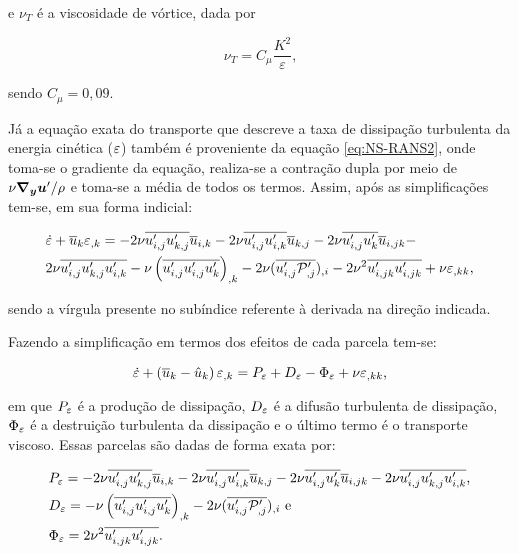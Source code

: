 \noindent e $\nu_T$ é a viscosidade de vórtice, dada por

\begin{equation}
    \nu_T=C_\mu\frac{K^2}{\varepsilon}\text{,}
\end{equation}

\noindent sendo $C_\mu=0,09$.

Já a equação exata do transporte que descreve a taxa de dissipação turbulenta da energia cinética ($\varepsilon$) também é proveniente da equação \eqref{eq:NS-RANS2}, onde toma-se o gradiente da equação, realiza-se a contração dupla por meio de $\nu\boldsymbol{\nabla_y}\boldsymbol{u}'/\rho$ e toma-se a média de todos os termos. Assim, após as simplificações tem-se, em sua forma indicial:

\begin{equation}
    \begin{split}
        &\dot{\varepsilon}+\overline{u}_k\varepsilon_{,k}=-2\nu\overline{u'_{i,j}u'_{k,j}}\overline{u}_{i,k}-2\nu\overline{u'_{i,j}u'_{i,k}}\overline{u}_{k,j}-2\nu\overline{u'_{i,j}u'_k}\overline{u}_{i,jk}-\\
        &2\nu\overline{u'_{i,j}u'_{k,j}u'_{i,k}}-\nu\left({\overline{u'_{i,j}u'_{i,j}u'_k}}\right)_{,k}-2\nu(\overline{u'_{i,j}\mathcal{P}'_{,j}})_{,i}-2\nu^2\overline{u'_{i,jk}u'_{i,jk}}+\nu\varepsilon_{,kk}\text{,}
    \end{split}
\end{equation}

\noindent sendo a vírgula presente no subíndice referente à derivada na direção indicada.

Fazendo a simplificação em termos dos efeitos de cada parcela tem-se:

\begin{equation}
    \dot{\varepsilon}+\left({\overline{u}_{k}-\hat{u}_{k}}\right)\varepsilon_{,k}=P_\varepsilon+D_\varepsilon-\Phi_\varepsilon+\nu\varepsilon_{,kk}\text{,}
\end{equation}

\noindent em que $P_\varepsilon$ é a produção de dissipação, $D_\varepsilon$ é a difusão turbulenta de dissipação, $\Phi_\varepsilon$ é a destruição turbulenta da dissipação e o último termo é o transporte viscoso. Essas parcelas são dadas de forma exata por:

\begin{subequations}
    \begin{align}
         & P_\varepsilon=-2\nu\overline{u'_{i,j}u'_{k,j}}\overline{u}_{i,k}-2\nu\overline{u'_{i,j}u'_{i,k}}\overline{u}_{k,j}-2\nu\overline{u'_{i,j}u'_k}\overline{u}_{i,jk}-2\nu\overline{u'_{i,j}u'_{k,j}u'_{i,k}} \text{,} \\
         & D_\varepsilon=-\nu\left({\overline{u'_{i,j}u'_{i,j}u'_k}}\right)_{,k}-2\nu(\overline{u'_{i,j}\mathcal{P}'_{,j}})_{,i} \text{ e}                                                                         \\
         & \Phi_\varepsilon=2\nu^2\overline{u'_{i,jk}u'_{i,jk}}\text{.}
    \end{align}
\end{subequations}


